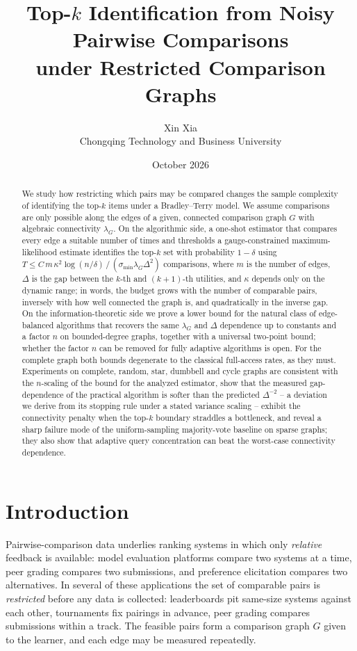 \documentclass[11pt]{article}
\title{Top-$k$ Identification from Noisy Pairwise Comparisons\\ under Restricted Comparison Graphs}
\author{Xin Xia\\ Chongqing Technology and Business University}
\date{October 2026}
\theoremstyle{definition}
\newcommand{\lG}{\lambda_G}
\begin{document}
\maketitle

\begin{abstract}
We study how restricting which pairs may be compared changes the sample complexity of identifying the top-$k$ items under a Bradley--Terry model.  We assume comparisons are only possible along the edges of a given, connected comparison graph $G$ with algebraic connectivity $\lG$.  On the algorithmic side, a one-shot estimator that compares every edge a suitable number of times and thresholds a gauge-constrained maximum-likelihood estimate identifies the top-$k$ set with probability $1-\delta$ using
$T \le C\, m\, \kappa^2 \log(n/\delta)\, /\, (\sigma_{\min}\lG\Delta^2)$
comparisons, where $m$ is the number of edges, $\Delta$ is the gap between the $k$-th and $(k{+}1)$-th utilities, and $\kappa$ depends only on the dynamic range; in words, the budget grows with the number of comparable pairs, inversely with how well connected the graph is, and quadratically in the inverse gap.  On the information-theoretic side we prove a lower bound for the natural class of edge-balanced algorithms that recovers the same $\lG$ and $\Delta$ dependence up to constants and a factor $n$ on bounded-degree graphs, together with a universal two-point bound; whether the factor $n$ can be removed for fully adaptive algorithms is open.  For the complete graph both bounds degenerate to the classical full-access rates, as they must.  Experiments on complete, random, star, dumbbell and cycle graphs are consistent with the $n$-scaling of the bound for the analyzed estimator, show that the measured gap-dependence of the practical algorithm is softer than the predicted $\Delta^{-2}$ -- a deviation we derive from its stopping rule under a stated variance scaling -- exhibit the connectivity penalty when the top-$k$ boundary straddles a bottleneck, and reveal a sharp failure mode of the uniform-sampling majority-vote baseline on sparse graphs; they also show that adaptive query concentration can beat the worst-case connectivity dependence.
\end{abstract}

\section{Introduction}
\label{sec:intro}

Pairwise-comparison data underlies ranking systems in which only \emph{relative} feedback is available: model evaluation platforms compare two systems at a time, peer grading compares two submissions, and preference elicitation compares two alternatives.  In several of these applications the set of comparable pairs is \emph{restricted} before any data is collected: leaderboards pit same-size systems against each other, tournaments fix pairings in advance, peer grading compares submissions within a track.  The feasible pairs form a comparison graph $G$ given to the learner, and each edge may be measured repeatedly.
\end{document}

